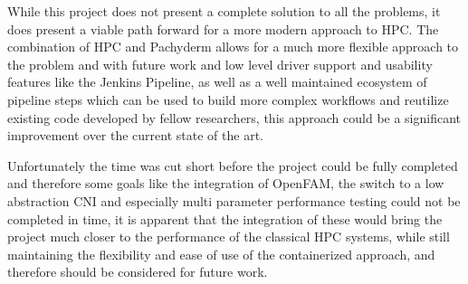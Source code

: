While this project does not present a complete solution to all the problems, it does present a viable path forward for a more modern approach to \ac{HPC}.
The combination of \ac{HPC} and Pachyderm allows for a much more flexible approach to the problem and with future work and low level driver support and usability 
features like the Jenkins Pipeline, as well as a well maintained ecosystem of pipeline steps which can be used to build more complex workflows and reutilize existing code
developed by fellow researchers, this approach could be a significant improvement over the current state of the art.

Unfortunately the time was cut short before the project could be fully completed and therefore some goals like the integration of OpenFAM, the switch to a low abstraction \ac{CNI} and especially 
multi parameter performance testing could not be completed in time, it is apparent that the integration of these would bring the project much closer to the performance  of the classical \ac{HPC} systems,
while still maintaining the flexibility and ease of use of the containerized approach, and therefore should be considered for future work.

